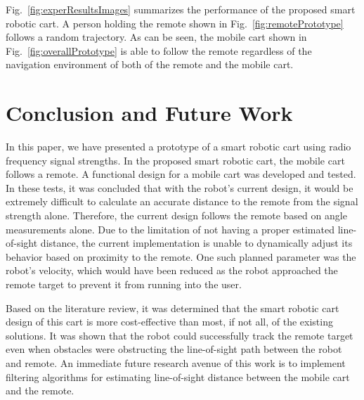 \documentclass[conference]{IEEEtran}
\begin{document}
%
Fig.~\ref{fig:experResultsImages} summarizes the performance of the proposed smart robotic cart. A person holding the remote shown in Fig.~\ref{fig:remotePrototype} follows a random trajectory. As can be seen, the mobile cart shown in Fig.~\ref{fig:overallPrototype} is able to follow the remote regardless of the navigation environment of both of the remote and the mobile cart. 



\section{Conclusion and Future Work}
In this paper, we have presented a prototype of a smart robotic cart using radio
frequency signal strengths. In the proposed smart robotic cart, the mobile cart
follows a remote. A functional design for a mobile cart was developed and
tested. In these tests, it was concluded that with the robot's current design,
it would be extremely difficult to calculate an accurate distance to the remote
from the signal strength alone. Therefore, the current design follows the remote
based on angle measurements alone. Due to the limitation of not having a proper
estimated line-of-sight distance, the current implementation is unable to
dynamically adjust its behavior based on proximity to the remote. One such
planned parameter was the robot's velocity, which would have been reduced as the
robot approached the remote target to prevent it from running into the user.


Based on the literature review, it was determined that the smart robotic cart
design of this cart is more cost-effective than most, if not all, of the
existing solutions. It was shown that the robot could successfully track the
remote target even when obstacles were obstructing the line-of-sight path
between the robot and remote. An immediate future research avenue of this work
is to implement filtering algorithms for estimating line-of-sight distance
between the mobile cart and the remote.



\end{document}
